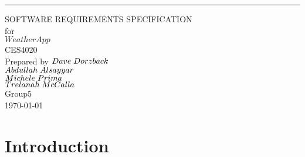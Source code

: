 \documentclass{scrreprt}
\date{}
\def\mygroup{5 }
\def\myclass{CES4020 }
\begin{document}
\begin{flushright}
    \rule{16cm}{5pt}\vskip1cm
    \begin{bfseries}
        \Huge{SOFTWARE REQUIREMENTS SPECIFICATION}\\
        \vspace{1.9cm}
        for\\
        \vspace{1.9cm}
        $Weather App$\\
        \vspace{1.9cm}
        \LARGE{\myclass}\\
        \vspace{1.9cm}
        Prepared by $Dave\hspace{1mm}Dorzback$\\$Abdullah\hspace{1mm}Alsayyar$\\$Michele\hspace{1mm}Prima$\\$Trelanah\hspace{1mm}McCalla$\\
        \vspace{1.9cm}
        Group\hspace{1mm}\mygroup\\
        \vspace{1.9cm}
        \today\\
    \end{bfseries}
\end{flushright}

\tableofcontents




\chapter{Introduction}
\end{document}
